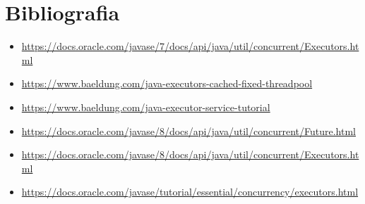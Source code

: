 \documentclass[12pt]{article}
\begin{document}
\newpage
\section{Bibliografia}
\begin{itemize}
    \item \url{https://docs.oracle.com/javase/7/docs/api/java/util/concurrent/Executors.html}
    \item \url{https://www.baeldung.com/java-executors-cached-fixed-threadpool}
    \item \url{https://www.baeldung.com/java-executor-service-tutorial}
    \item \url{https://docs.oracle.com/javase/8/docs/api/java/util/concurrent/Future.html}
    \item \url{https://docs.oracle.com/javase/8/docs/api/java/util/concurrent/Executors.html}
    \item \url{https://docs.oracle.com/javase/tutorial/essential/concurrency/executors.html}

\end{itemize}
\end{document}
